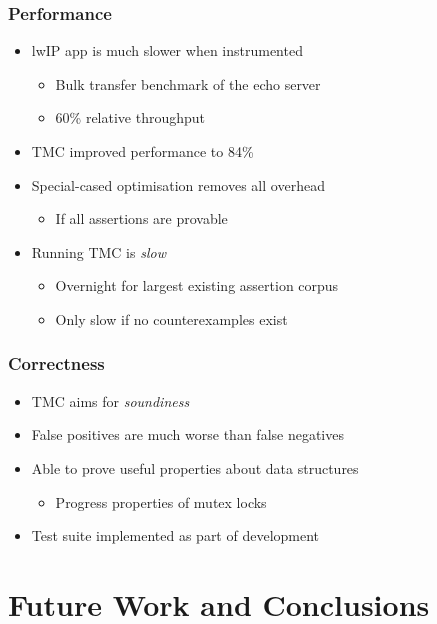 \documentclass{beamer}
\begin{document}
\begin{frame}
  \frametitle{Performance}

  \begin{itemize}
    \item lwIP app is much slower when instrumented
      \begin{itemize}
        \item Bulk transfer benchmark of the echo server
        \item 60\% relative throughput
      \end{itemize}
    \item TMC improved performance to 84\%
    \item Special-cased optimisation removes all overhead
      \begin{itemize}
        \item If all assertions are provable
      \end{itemize}
    \item Running TMC is \emph{slow}
      \begin{itemize}
        \item Overnight for largest existing assertion corpus
        \item Only slow if no counterexamples exist
      \end{itemize}
  \end{itemize}
\end{frame}

\begin{frame}
  \frametitle{Correctness}

  \begin{itemize}
    \item TMC aims for \emph{soundiness}
    \item False positives are much worse than false negatives
    \item Able to prove useful properties about data structures
      \begin{itemize}
        \item Progress properties of mutex locks
      \end{itemize}
    \item Test suite implemented as part of development
  \end{itemize}
\end{frame}

\section{Future Work and Conclusions}
\end{document}
